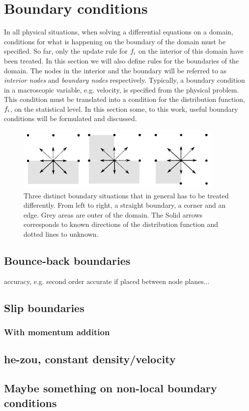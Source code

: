 \section{Boundary conditions}\label{sec:lbm:bound}
In all physical situations, when solving a differential equations on a
domain, conditions for what is happening on the boundary of the domain
must be specified. So far, only the update rule for $f_i$ on the
interior of this domain have been treated. In this section we will
also define rules for the boundaries of the domain. The nodes in the
interior and the boundary will be referred to as \emph{interior nodes}
and \emph{boundary nodes} respectively. Typically, a boundary
condition in a macroscopic variable, e.g. velocity, is specified from
the physical problem. This condition must be translated into a
condition for the distribution function, $f_i$, on the statistical
level. In this section some, to this work, useful boundary conditions
will be formulated and discussed.

\begin{figure}
\begin{center}
\includegraphics[width=0.9\textwidth]{fig/bb.pdf}
\end{center}
\caption{Three distinct boundary situations that in general has to be
  treated differently. From left to right, a straight boundary, a
  corner and an edge. Grey areas are outer of the domain. The Solid
  arrows corresponds to known directions of the distribution function
  and dotted lines to unknown.}
\label{fig:lbm:bounds}
\end{figure}

\subsection{Bounce-back boundaries}\label{sec:lbm:bb}
accuracy, e.g. second order accurate if placed between node planes...

\subsection{Slip boundaries}\label{sec:lbm:mirror}

\subsubsection{With momentum addition}\label{sec:lbm:mod_mirror}

\subsection{he-zou, constant density/velocity}

\subsection{Maybe something on non-local boundary conditions}
